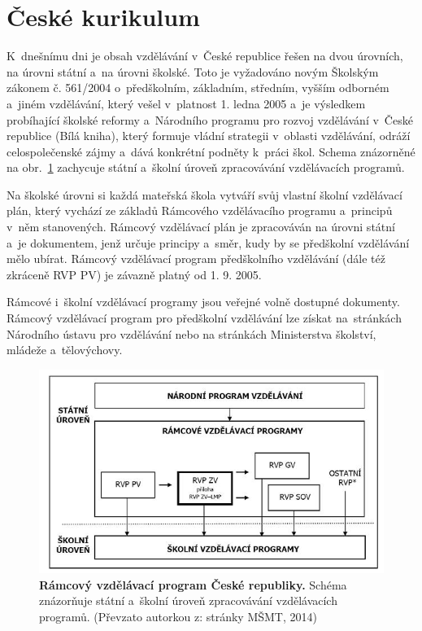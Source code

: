 	\section{České kurikulum}

		K dnešnímu dni je obsah vzdělávání v České republice řešen na dvou úrovních, na úrovni státní a~na úrovni školské. Toto je vyžadováno novým Školským zákonem č. 561/2004 o~předškolním, základním, středním, vyšším odborném a~jiném vzdělávání, který vešel v platnost 1. ledna 2005 a~je výsledkem probíhající školské reformy a~Národního programu pro rozvoj vzdělávání v České republice (Bílá kniha), který formuje vládní strategii v oblasti vzdělávání, odráží celospolečenské zájmy a~dává konkrétní podněty k práci škol. Schema znázorněné na obr.~\ref{obr:rvpCR} zachycuje státní a~školní úroveň zpracovávání vzdělávacích programů.

		Na školské úrovni si každá mateřská škola vytváří svůj vlastní školní vzdělávací plán, který vychází ze základů Rámcového vzdělávacího programu a~principů v něm stanovených. Rámcový vzdělávací plán je zpracováván na úrovni státní a~je dokumentem, jenž určuje principy a~směr, kudy by se předškolní vzdělávání mělo ubírat. Rámcový vzdělávací program předškolního vzdělávání (dále též zkráceně RVP PV) je závazně platný od 1. 9. 2005.

		Rámcové i~školní vzdělávací programy jsou veřejné volně dostupné dokumenty. Rámcový vzdělávací program pro předškolní vzdělávání lze získat na stránkách Národního ústavu pro vzdělávání \citep{RVP} nebo na stránkách Ministerstva školství, mládeže a~tělovýchovy.

		
		\begin{figure}[h]
			\vspace{15mm}
			\center
			\includegraphics[width=0.8\linewidth]{fotky/rvpCR.jpg}
			\caption{
				\textbf{Rámcový vzdělávací program České republiky.}
				Schéma znázorňuje státní a~školní úroveň zpracovávání vzdělávacích programů.
				(Převzato autorkou z: stránky MŠMT, 2014)
			}
			\label{obr:rvpCR}
		\end{figure}

